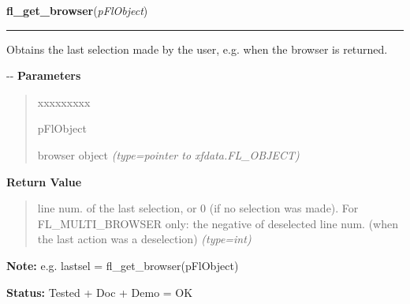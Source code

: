 \hspace{.8\funcindent}\begin{boxedminipage}{\funcwidth}

    \raggedright \textbf{fl\_get\_browser}(\textit{pFlObject})

    \vspace{-1.5ex}

    \rule{\textwidth}{0.5\fboxrule}
\setlength{\parskip}{2ex}

Obtains the last selection made by the user, e.g. when the browser is
returned.

-{}-
\setlength{\parskip}{1ex}
      \textbf{Parameters}
      \vspace{-1ex}

      \begin{quote}
        \begin{Ventry}{xxxxxxxxx}

          \item[pFlObject]


browser object
            {\it (type=pointer to xfdata.FL\_OBJECT)}

        \end{Ventry}

      \end{quote}

      \textbf{Return Value}
    \vspace{-1ex}

      \begin{quote}

line num. of the last selection, or 0 (if no selection was made).
For FL\_MULTI\_BROWSER only: the negative of deselected line num. (when
the last action was a deselection)
      {\it (type=int)}

      \end{quote}

\textbf{Note:} 
e.g. lastsel = fl\_get\_browser(pFlObject)


\textbf{Status:} 
Tested + Doc + Demo = OK


    \end{boxedminipage}

    \label{xformslib:flbrowser:fl_get_browser_maxline}

    \vspace{0.5ex}

